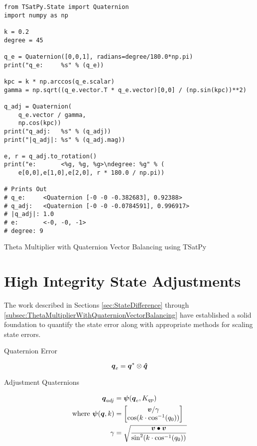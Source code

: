 \begin{listing}[H]
\begin{singlespace}
  \begin{verbatim}
from TSatPy.State import Quaternion
import numpy as np

k = 0.2
degree = 45

q_e = Quaternion([0,0,1], radians=degree/180.0*np.pi)
print("q_e:     %s" % (q_e))

kpc = k * np.arccos(q_e.scalar)
gamma = np.sqrt((q_e.vector.T * q_e.vector)[0,0] / (np.sin(kpc))**2)

q_adj = Quaternion(
    q_e.vector / gamma,
    np.cos(kpc))
print("q_adj:   %s" % (q_adj))
print("|q_adj|: %s" % (q_adj.mag))

e, r = q_adj.to_rotation()
print("e:       <%g, %g, %g>\ndegree: %g" % (
    e[0,0],e[1,0],e[2,0], r * 180.0 / np.pi))

# Prints Out
# q_e:     <Quaternion [-0 -0 -0.382683], 0.92388>
# q_adj:   <Quaternion [-0 -0 -0.0784591], 0.996917>
# |q_adj|: 1.0
# e:       <-0, -0, -1>
# degree: 9
  \end{verbatim}
\caption{Theta Multiplier with Quaternion Vector Balancing using TSatPy}
\label{code:}
\nocite{minted}
\end{singlespace}
\end{listing}

\section{High Integrity State Adjustments}
\label{sec:HighIntegrityStateAdjustments}

The work described in Sections \ref{sec:StateDifference} through \ref{subsec:ThetaMultiplierWithQuaternionVectorBalancing} have established a solid foundation to quantify the state error along with appropriate methods for scaling state errors.

Quaternion Error

\begin{equation}
  \boldsymbol{q}_e = \boldsymbol{q}^* \otimes \boldsymbol{\hat{q}}
\end{equation}

Adjustment Quaternions

\begin{equation}
  \begin{aligned}
    \boldsymbol{q}_{adj} &= \boldsymbol{\psi}(\boldsymbol{q}_e, K_{qp}) \\
    \text{where } \boldsymbol{\psi}(\boldsymbol{q}, k) &= \begin{bmatrix} \boldsymbol{v} / \gamma \\ \cos ( k \cdot \cos^{-1} (q_0))  \end{bmatrix} \\
    \gamma &= \sqrt{\frac{\boldsymbol{v} \bullet \boldsymbol{v}}{\sin^2 ( k \cdot \cos^{-1} (q_0))}}
  \end{aligned}
\end{equation}

